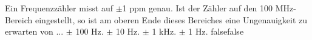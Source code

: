     {Ein Frequenzzähler misst auf $±$1 ppm genau. Ist der Zähler auf den 100 MHz-Bereich eingestellt, so ist am oberen Ende dieses Bereiches eine Ungenauigkeit zu erwarten von ...}
    {$±$ 100 Hz.}
    {$±$ 10 Hz.}
    {$±$ 1 kHz.}
    {$±$ 1 Hz.}
    {false}{false}
